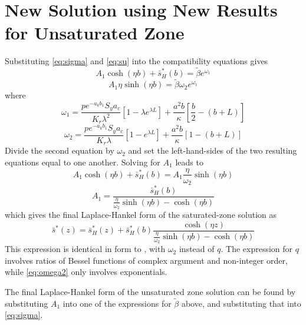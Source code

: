 \documentclass{article}
\begin{document}
\section{New Solution using New Results for Unsaturated Zone}
Substituting \eqref{eq:sigma} and \eqref{eq:su} into the compatibility equations gives
$$  A_1 \cosh(\eta b) + \bar{s}_H^{\ast}(b) = \tilde{\beta}e^{\omega_1}$$
$$ A_1 \eta  \sinh(\eta b)  = \tilde{\beta} \omega_2 e^{\omega_1}$$
where 
$$ \omega_1 = \frac{p e^{-a_k b_1} S_y a_c} {K_r \lambda^2} \left[ 1  - \lambda e^{\lambda L} \right] + \frac{a^2 b}{\kappa}\left[\frac{b}{2} - \left( b+L\right) \right]$$
\begin{equation}
  \label{eq:omega2}
  \omega_2 = \frac{p e^{-a_k b_1} S_y a_c} {K_r \lambda} \left[ 1  -  e^{\lambda L} \right] + \frac{a^2 b}{\kappa}\left[1 - \left( b+L\right) \right]
\end{equation}
Divide the second equation by $\omega_2$ and set the left-hand-sides of the two resulting equations equal to one another.  Solving for $A_1$ leads to
$$A_1 \cosh(\eta b) + \bar{s}_H^{\ast}(b) = A_1 \frac{\eta}{\omega_2}  \sinh(\eta b) $$
$$ A_1 = \frac{\bar{s}_H^{\ast}(b)}{\frac{\eta}{\omega_2}  \sinh(\eta b) - \cosh(\eta b)}$$
which gives the final Laplace-Hankel form of the saturated-zone solution as
$$ \bar{s}^{\ast}(z)  = \bar{s}_H^{\ast}(z) + \bar{s}_H^{\ast}(b) \frac{\cosh(\eta z)}{\frac{\eta}{\omega_2}  \sinh(\eta b) - \cosh(\eta b)}$$ 
This expression is identical in form to \cite[eqn.\ C17]{mishra10}, with $\omega_2$ instead of $q$.  The expression for $q$ \cite[eqn.\ D13]{mishra10} involves ratios of Bessel functions of complex argument and non-integer order, while \eqref{eq:omega2} only involves exponentials.

The final Laplace-Hankel form of the unsaturated zone solution can be found by substituting $A_1$ into one of the expressions for $\tilde\beta$ above, and substituting that into \eqref{eq:sigma}.


\end{document}
